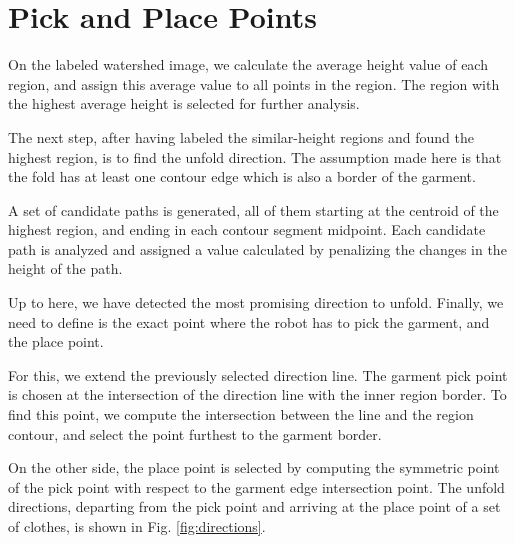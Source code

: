\section{Pick and Place Points}
On the labeled watershed image, we calculate the average height value of each region, and assign this average value to all points in the region. The region with the highest average height is selected for further analysis. 

The next step, after having labeled the similar-height regions and found the highest region, is to find the unfold direction. The assumption made here is that the fold has at least one contour edge which is also a border of the garment. 

A set of candidate paths is generated, all of them starting at the centroid of the highest region, and ending in each contour segment midpoint. Each candidate path is analyzed and assigned a value calculated by penalizing the changes in the height of the path.

Up to here, we have detected the most promising direction to unfold. Finally, we need to define is the exact point where the robot has to pick the garment, and the place point. 

For this, we extend the previously selected direction line. The garment pick point is chosen at the intersection of the direction line with the inner region border. To find this point, we compute the intersection between the line and the region contour, and select the point furthest to the garment border.

On the other side, the place point is selected by computing the symmetric point of the pick point with respect to the garment edge intersection point. The unfold directions, departing from the pick point and arriving at the place point of a set of clothes, is shown in Fig. \ref{fig:directions}.
